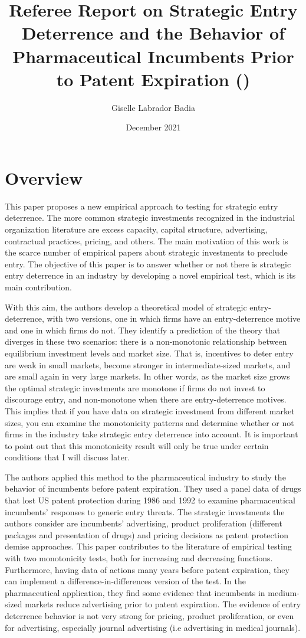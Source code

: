 \documentclass{article}
\title{Referee Report on Strategic Entry Deterrence and the Behavior of Pharmaceutical Incumbents Prior to Patent Expiration (\cite{ellison2011strategic})}
\author{Giselle Labrador Badia}
\date{December 2021}
\theoremstyle{definition}
\begin{document}
\maketitle

\section*{Overview}

This paper proposes a new empirical approach to testing for strategic entry deterrence. The more common strategic investments recognized in the industrial organization literature are excess capacity, capital structure, advertising, contractual practices, pricing, and others. The main motivation of this work is the scarce number of empirical papers about strategic investments to preclude entry. The objective of this paper is to answer whether or not there is strategic entry deterrence in an industry by developing a novel empirical test, which is its main contribution.  

With this aim, the authors develop a theoretical model of strategic entry-deterrence, with two versions, one in which firms have an entry-deterrence motive and one in which firms do not. They identify a prediction of the theory that diverges in these two scenarios: there is a non-monotonic relationship between equilibrium investment levels and market size. That is, incentives to deter entry are weak in small markets, become stronger in  intermediate-sized markets, and are small again in very large markets. In other words, as the market size grows the optimal strategic investments are monotone if firms do not invest to discourage entry, and non-monotone when there are entry-deterrence motives. This implies that if you have data on strategic investment from different market sizes, you can examine the monotonicity patterns and determine whether or not firms in the industry take strategic entry deterrence into account. It is important to point out that this monotonicity result will only be true under certain conditions that I will discuss later. 

The authors applied this method to the pharmaceutical industry to study the behavior of incumbents before patent expiration. They used a panel data of drugs that lost US patent protection during 1986 and 1992 to examine pharmaceutical incumbents' responses to generic entry threats.  The strategic investments the authors consider are incumbents' advertising, product proliferation (different packages and presentation of drugs) and pricing decisions as patent protection demise approaches. This paper contributes to the literature of empirical testing with two monotonicity tests, both for increasing and decreasing functions. Furthermore, having data of actions many years before patent expiration, they can implement a difference-in-differences version of the test. In the pharmaceutical application, they find some evidence that incumbents in medium-sized markets reduce advertising prior to patent expiration. The evidence of entry deterrence behavior is not very strong for pricing, product proliferation, or even for advertising, especially journal advertising (i.e advertising in medical journals). 
\end{document}

